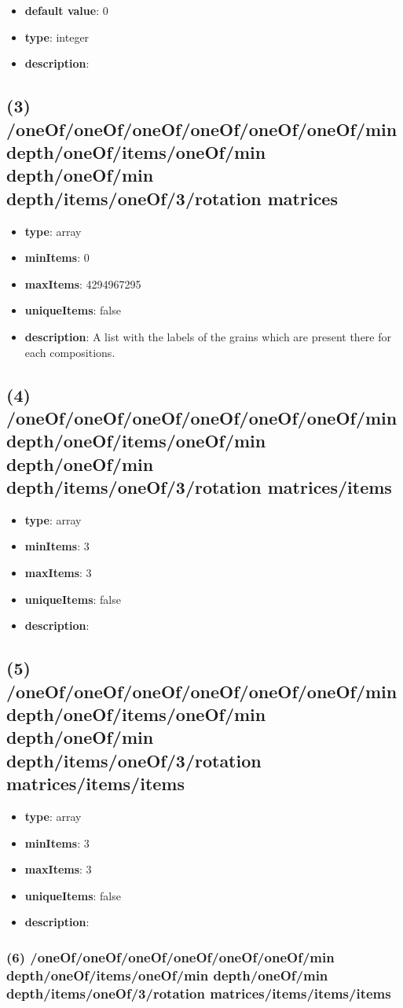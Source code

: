 \begin{itemize}[leftmargin=4em]\item {\bf default value}: 0
\item {\bf type}: integer
\item {\bf description}: 
\end{itemize}\subsection{(3) /oneOf/oneOf/oneOf/oneOf/oneOf/oneOf/min depth/oneOf/items/oneOf/min depth/oneOf/min depth/items/oneOf/3/rotation matrices}
\begin{itemize}[leftmargin=3em]\item {\bf type}: array
\item {\bf minItems}: 0
\item {\bf maxItems}: 4294967295
\item {\bf uniqueItems}: false
\item {\bf description}: A list with the labels of the grains which are present there for each compositions.
\end{itemize}\subsection{(4) /oneOf/oneOf/oneOf/oneOf/oneOf/oneOf/min depth/oneOf/items/oneOf/min depth/oneOf/min depth/items/oneOf/3/rotation matrices/items}
\begin{itemize}[leftmargin=4em]\item {\bf type}: array
\item {\bf minItems}: 3
\item {\bf maxItems}: 3
\item {\bf uniqueItems}: false
\item {\bf description}: 
\end{itemize}\subsection{(5) /oneOf/oneOf/oneOf/oneOf/oneOf/oneOf/min depth/oneOf/items/oneOf/min depth/oneOf/min depth/items/oneOf/3/rotation matrices/items/items}
\begin{itemize}[leftmargin=5em]\item {\bf type}: array
\item {\bf minItems}: 3
\item {\bf maxItems}: 3
\item {\bf uniqueItems}: false
\item {\bf description}: 
\end{itemize}\subsubsection{(6) /oneOf/oneOf/oneOf/oneOf/oneOf/oneOf/min depth/oneOf/items/oneOf/min depth/oneOf/min depth/items/oneOf/3/rotation matrices/items/items/items}
